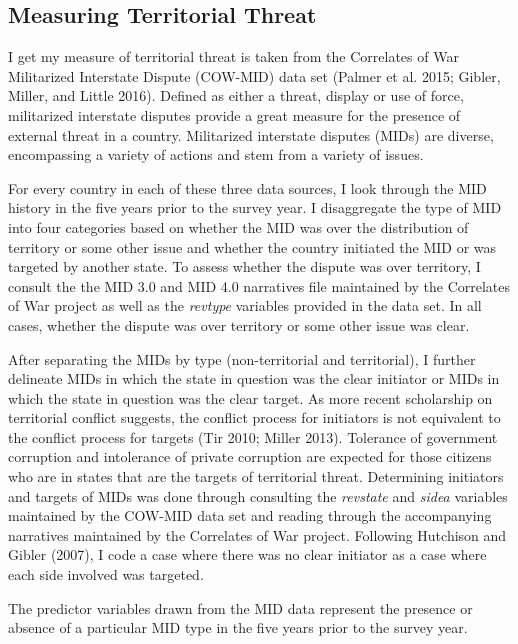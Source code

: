 \documentclass[11pt,]{article}
\begin{document}
\subsection{Measuring Territorial
Threat}\label{measuring-territorial-threat}

I get my measure of territorial threat is taken from the Correlates of
War Militarized Interstate Dispute (COW-MID) data set (Palmer et al.
2015; Gibler, Miller, and Little 2016). Defined as either a threat,
display or use of force, militarized interstate disputes provide a great
measure for the presence of external threat in a country. Militarized
interstate disputes (MIDs) are diverse, encompassing a variety of
actions and stem from a variety of issues.

For every country in each of these three data sources, I look through
the MID history in the five years prior to the survey year. I
disaggregate the type of MID into four categories based on whether the
MID was over the distribution of territory or some other issue and
whether the country initiated the MID or was targeted by another state.
To assess whether the dispute was over territory, I consult the the MID
3.0 and MID 4.0 narratives file maintained by the Correlates of War
project as well as the \emph{revtype} variables provided in the data
set. In all cases, whether the dispute was over territory or some other
issue was clear.

After separating the MIDs by type (non-territorial and territorial), I
further delineate MIDs in which the state in question was the clear
initiator or MIDs in which the state in question was the clear target.
As more recent scholarship on territorial conflict suggests, the
conflict process for initiators is not equivalent to the conflict
process for targets (Tir 2010; Miller 2013). Tolerance of government
corruption and intolerance of private corruption are expected for those
citizens who are in states that are the targets of territorial threat.
Determining initiators and targets of MIDs was done through consulting
the \emph{revstate} and \emph{sidea} variables maintained by the COW-MID
data set and reading through the accompanying narratives maintained by
the Correlates of War project. Following Hutchison and Gibler (2007), I
code a case where there was no clear initiator as a case where each side
involved was targeted.

The predictor variables drawn from the MID data represent the presence
or absence of a particular MID type in the five years prior to the
survey year.
\end{document}
